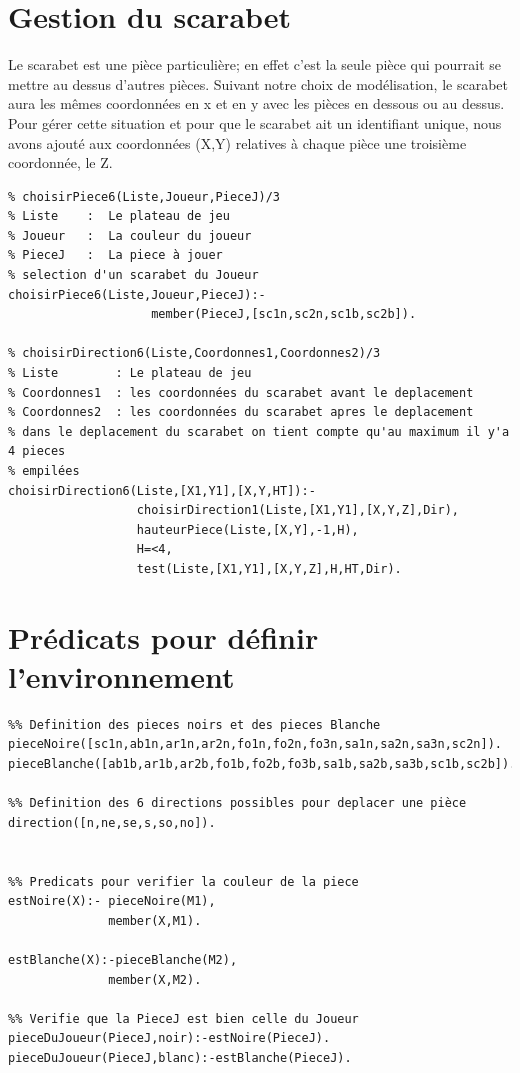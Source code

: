 \documentclass[a4paper,10pt]{article}
\begin{document}
\section{Gestion du scarabet}
Le scarabet est une pièce particulière; en effet c'est la seule pièce qui
pourrait se mettre au dessus d'autres pièces. Suivant notre choix de
modélisation, le scarabet aura les mêmes coordonnées en x et en y avec les
pièces en dessous ou au dessus. Pour gérer cette situation et pour que le
scarabet ait un identifiant unique, nous avons ajouté aux coordonnées (X,Y) 
relatives à chaque pièce une troisième coordonnée, le
Z.
\begin{verbatim}
% choisirPiece6(Liste,Joueur,PieceJ)/3
% Liste    :  Le plateau de jeu
% Joueur   :  La couleur du joueur
% PieceJ   :  La piece à jouer
% selection d'un scarabet du Joueur
choisirPiece6(Liste,Joueur,PieceJ):-				
				    member(PieceJ,[sc1n,sc2n,sc1b,sc2b]).

% choisirDirection6(Liste,Coordonnes1,Coordonnes2)/3
% Liste        : Le plateau de jeu
% Coordonnes1  : les coordonnées du scarabet avant le deplacement
% Coordonnes2  : les coordonnées du scarabet apres le deplacement
% dans le deplacement du scarabet on tient compte qu'au maximum il y'a 4 pieces
% empilées
choisirDirection6(Liste,[X1,Y1],[X,Y,HT]):-
			      choisirDirection1(Liste,[X1,Y1],[X,Y,Z],Dir),	
			      hauteurPiece(Liste,[X,Y],-1,H),			
			      H=<4,						
			      test(Liste,[X1,Y1],[X,Y,Z],H,HT,Dir).

\end{verbatim}
\section{Prédicats pour définir l'environnement}
\begin{verbatim}
%% Definition des pieces noirs et des pieces Blanche
pieceNoire([sc1n,ab1n,ar1n,ar2n,fo1n,fo2n,fo3n,sa1n,sa2n,sa3n,sc2n]).
pieceBlanche([ab1b,ar1b,ar2b,fo1b,fo2b,fo3b,sa1b,sa2b,sa3b,sc1b,sc2b]).

%% Definition des 6 directions possibles pour deplacer une pièce
direction([n,ne,se,s,so,no]).


%% Predicats pour verifier la couleur de la piece             
estNoire(X):- pieceNoire(M1),
              member(X,M1).
            
estBlanche(X):-pieceBlanche(M2),
              member(X,M2).            
                       
%% Verifie que la PieceJ est bien celle du Joueur
pieceDuJoueur(PieceJ,noir):-estNoire(PieceJ).
pieceDuJoueur(PieceJ,blanc):-estBlanche(PieceJ).
\end{verbatim}
\end{document}
